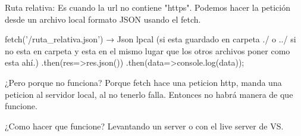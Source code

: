 Ruta relativa:
Es cuando la url no contiene "https".
Podemos hacer la petición desde un archivo local formato JSON usando el fetch.

fetch('/ruta_relativa.json') → Json lpcal (si esta guardado en carpeta ./ o ../ si no esta en carpeta y esta en el mismo lugar que los otros archivos poner como esta ahí.)
.then(res=>res.json())
.then(data=>{console.log(data)});

¿Pero porque no funciona?
Porque fetch hace una peticion http, manda una peticion al servidor local, al no tenerlo falla. Entonces no habrá manera de que funcione.

¿Como hacer que funcione?
Levantando un server o con el live server de VS.